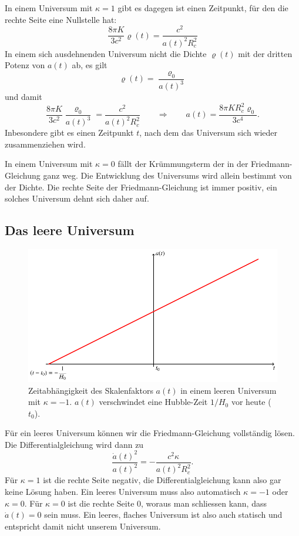 In einem Universum mit $\kappa=1$ gibt es dagegen ist einen Zeitpunkt, für
den die rechte Seite eine Nullstelle hat:
\[
\frac{8\pi K}{3c^2}\varrho(t)=\frac{c^2}{a(t)^2R_c^2}
\]
In einem sich ausdehnenden Universum nicht die Dichte $\varrho(t)$ mit
der dritten Potenz von $a(t)$ ab, es gilt
\[
\varrho(t) = \frac{\varrho_0}{a(t)^3}
\]
und damit
\[
\frac{8\pi K}{3c^2}\frac{\varrho_0}{a(t)^3}=\frac{c^2}{a(t)^2R_c^2}
\qquad\Rightarrow\qquad
a(t)
=
\frac{8\pi K R_c^2\varrho_0}{3c^4}.
\]
Inbesondere gibt es einen Zeitpunkt $t$, nach dem das Universum sich
wieder zusammenziehen wird.

In einem Universum mit $\kappa=0$ fällt der Krümmungsterm der in 
der Friedmann-Gleichung ganz weg.
Die Entwicklung des Universums wird allein bestimmt von der Dichte.
Die rechte Seite der Friedmann-Gleichung ist immer positiv, ein
solches Universum dehnt sich daher auf.

\subsection{Das leere Universum}
\begin{figure}
\centering
\includegraphics{chapters/tikz/friedmann-leer.pdf}
\caption{Zeitabhängigkeit des Skalenfaktors $a(t)$ in einem leeren
Universum mit $\kappa = -1$.
$a(t)$ verschwindet eine Hubble-Zeit $1/H_0$ vor heute ($t_0$).
\label{chapter:friedmann:graph:leer}}
\end{figure}
Für ein leeres Universum können wir die Friedmann-Gleichung vollständig
lösen.
Die Differentialgleichung wird dann zu
\[
\frac{\dot a(t)^2}{a(t)^2}
=
-\frac{c^2\kappa}{a(t)^2R_c^2}.
\]
Für $\kappa=1$ ist die rechte Seite negativ, die Differentialgleichung
kann also gar keine Lösung haben.
Ein leeres Universum muss also automatisch $\kappa=-1$ oder $\kappa=0$.
Für $\kappa=0$ ist die rechte Seite $0$, woraus man schliessen kann,
dass $\dot a(t)=0$ sein muss.
Ein leeres, flaches Universum ist also auch statisch und entspricht
damit nicht unserem Universum.

